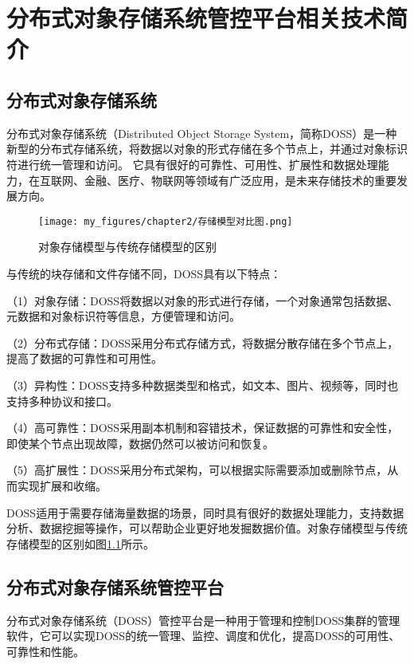 \chapter{分布式对象存储系统管控平台相关技术简介}

\section{分布式对象存储系统}

分布式对象存储系统（Distributed Object Storage System，简称DOSS）是一种新型的分布式存储系统，将数据以对象的形式存储在多个节点上，并通过对象标识符进行统一管理和访问。
它具有很好的可靠性、可用性、扩展性和数据处理能力\cite{kongeji}，在互联网、金融、医疗、物联网等领域有广泛应用，是未来存储技术的重要发展方向。

\begin{figure}[h]
    \centering
    \texttt{[image: my\_figures/chapter2/存储模型对比图.png]}
    \caption{对象存储模型与传统存储模型的区别}
    \label{fig:/存储模型对比图}
\end{figure}

与传统的块存储和文件存储不同，DOSS具有以下特点：

（1）对象存储：DOSS将数据以对象的形式进行存储，一个对象通常包括数据、元数据和对象标识符等信息，方便管理和访问。

（2）分布式存储：DOSS采用分布式存储方式，将数据分散存储在多个节点上，提高了数据的可靠性和可用性。

（3）异构性：DOSS支持多种数据类型和格式，如文本、图片、视频等，同时也支持多种协议和接口\cite{kongqng2015keji}。

（4）高可靠性：DOSS采用副本机制和容错技术，保证数据的可靠性和安全性，即使某个节点出现故障，数据仍然可以被访问和恢复。

（5）高扩展性：DOSS采用分布式架构，可以根据实际需要添加或删除节点，从而实现扩展和收缩。

DOSS适用于需要存储海量数据的场景，同时具有很好的数据处理能力，支持数据分析、数据挖掘等操作，可以帮助企业更好地发掘数据价值。对象存储模型与传统存储模型的区别如图\ref{fig:/存储模型对比图}所示。




\section{分布式对象存储系统管控平台}

分布式对象存储系统（DOSS）管控平台是一种用于管理和控制DOSS集群的管理软件，它可以实现DOSS的统一管理、监控、调度和优化，提高DOSS的可用性、可靠性和性能\cite{kongqineji}。

